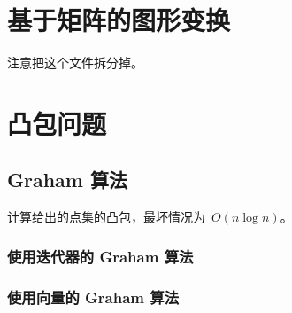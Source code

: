 
\section{基于矩阵的图形变换}

注意把这个文件拆分掉。




\section{凸包问题}

\subsection{Graham 算法}

计算给出的点集的凸包，最坏情况为~$O(n\log{n})$。

\subsubsection{使用迭代器的 Graham 算法}



\subsubsection{使用向量的 Graham 算法}


